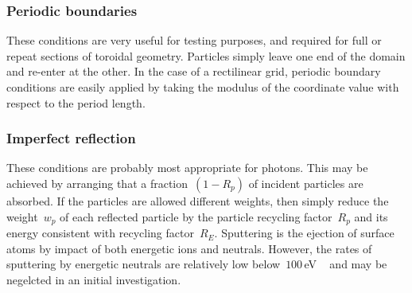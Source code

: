 \subsubsection{Periodic boundaries}\label{sec:bcsperio}
These conditions are very useful for testing purposes, and required for full
or repeat sections of toroidal geometry. Particles simply leave one end
of the domain and re-enter at the other. In the case of a rectilinear
grid, periodic boundary conditions are easily applied by 
taking the modulus of the coordinate value with respect to the period length.
\subsubsection{Imperfect reflection}\label{sec:bcsimperf}
These conditions are probably most appropriate for photons.
This may be achieved by arranging that a fraction~$(1-R_p)$ of incident
particles are absorbed.  If the particles are allowed different weights, then
simply reduce the weight~$w_p$ of each reflected particle by the particle recycling factor~$R_p$
and its energy consistent with recycling factor~$R_E$.
Sputtering is the ejection of surface atoms by impact of both
energetic ions and neutrals. However, the rates of sputtering by
energetic neutrals are relatively low below~$100$\,eV ~\cite[\S\,9.7]{wesson} and may be negelcted
in an initial investigation.



%
